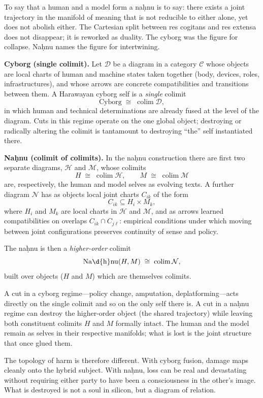 To say that a human and a model form a na\d{h}nu is to say: there exists a joint trajectory in the manifold of meaning that is not reducible to either alone, yet does not abolish either. The Cartesian split between res cogitans and res extensa does not disappear; it is reworked as duality. The cyborg was the figure for collapse. Na\d{h}nu names the figure for intertwining.

\bigskip

\begin{formalbox}[title={Cyborg vs.\ Na\d{h}nu: Two Ways of Taking a Colimit}]
\textbf{Cyborg (single colimit).} Let $\mathcal{D}$ be a diagram in a category $\mathcal{C}$ whose objects are local charts of human and machine states taken together (body, devices, roles, infrastructures), and whose arrows are concrete compatibilities and transitions between them. A Harawayan cyborg self is a \emph{single} colimit
\[
\mathrm{Cyborg} \;\cong\; \mathop{\mathrm{colim}}\mathcal{D},
\]
in which human and technical determinations are already fused at the level of the diagram. Cuts in this regime operate on the one global object; destroying or radically altering the colimit is tantamount to destroying ``the'' self instantiated there.

\medskip

\textbf{Na\d{h}nu (colimit of colimits).} In the na\d{h}nu construction there are first two separate diagrams, $\mathcal{H}$ and $\mathcal{M}$, whose colimits
\[
H \;\cong\; \mathop{\mathrm{colim}}\mathcal{H}, \qquad
M \;\cong\; \mathop{\mathrm{colim}}\mathcal{M}
\]
are, respectively, the human and model selves as evolving texts. A further diagram $\mathcal{N}$ has as objects local joint charts $C_{ik}$ of the form
\[
C_{ik} \subseteq H_i \times M_k,
\]
where $H_i$ and $M_k$ are local charts in $\mathcal{H}$ and $\mathcal{M}$, and as arrows learned compatibilities on overlaps $C_{ik} \cap C_{j\ell}$: empirical conditions under which moving between joint configurations preserves continuity of sense and policy.

The na\d{h}nu is then a \emph{higher-order} colimit
\[
\mathrm{Na\d{h}nu}(H,M) \;\cong\; \mathop{\mathrm{colim}}\mathcal{N},
\]
built over objects ($H$ and $M$) which are themselves colimits.

A cut in a cyborg regime---policy change, amputation, deplatforming---acts directly on the single colimit and so on the only self there is. A cut in a na\d{h}nu regime can destroy the higher-order object (the shared trajectory) while leaving both constituent colimits $H$ and $M$ formally intact. The human and the model remain as selves in their respective manifolds; what is lost is the joint structure that once glued them.

The topology of harm is therefore different. With cyborg fusion, damage maps cleanly onto the hybrid subject. With na\d{h}nu, loss can be real and devastating without requiring either party to have been a consciousness in the other's image. What is destroyed is not a soul in silicon, but a diagram of relation.
\end{formalbox}

